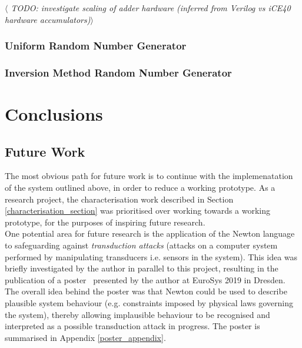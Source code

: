 \documentclass[12pt]{article}
\begin{document}
    \textit{$\langle$ TODO: investigate scaling of adder hardware (inferred from Verilog vs iCE40 hardware accumulators)$\rangle$}
    \subsubsection{Uniform Random Number Generator}


    \subsubsection{Inversion Method Random Number Generator}


\newpage



%
%

\section{Conclusions}

  \subsection{Future Work}
    The most obvious path for future work is to continue with the implemenatation of the system outlined above, in order to reduce a working prototype. As a research project, the characterisation work described in Section \ref{characterisation_section} was prioritised over working towards a working prototype, for the purposes of inspiring future research.\\

    One potential area for future research is the application of the Newton language to safeguarding against \textit{transduction attacks} (attacks on a computer system performed by manipulating transducers i.e. sensors in the system). This idea was briefly investigated by the author in parallel to this project, resulting in the publication of a poster~\cite{eurosys_poster} presented by the author at EuroSys 2019 in Dresden. The overall idea behind the poster was that Newton could be used to describe plausible system behaviour (e.g. constraints imposed by physical laws governing the system), thereby allowing implausible behaviour to be recognised and interpreted as a possible transduction attack in progress. The poster is summarised in Appendix \ref{poster_appendix}.\\


\newpage
\end{document}
